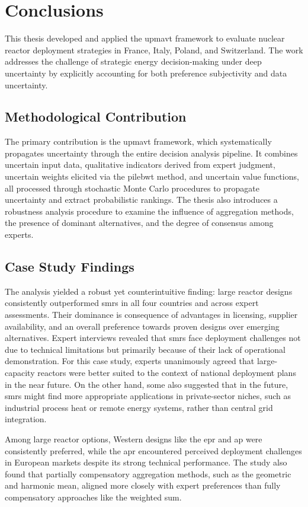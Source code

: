 \chapter{Conclusions}
\label{sec:conclusions}
This thesis developed and applied the \gls{upmavt} framework to evaluate nuclear reactor deployment strategies in France, Italy, Poland, and Switzerland. The work addresses the challenge of strategic energy decision-making under deep uncertainty by explicitly accounting for both preference subjectivity and data uncertainty.

\section{Methodological Contribution}
The primary contribution is the \gls{upmavt} framework, which systematically propagates uncertainty through the entire decision analysis pipeline. It combines uncertain input data, qualitative indicators derived from expert judgment, uncertain weights elicited via the \gls{pilebwt} method, and uncertain value functions, all processed through stochastic Monte Carlo procedures to propagate uncertainty and extract probabilistic rankings. The thesis also introduces a robustness analysis procedure to examine the influence of aggregation methods, the presence of dominant alternatives, and the degree of consensus among experts.

\section{Case Study Findings}
The analysis yielded a robust yet counterintuitive finding: large reactor designs consistently outperformed \glspl{smr} in all four countries and across expert assessments. Their dominance is consequence of advantages in licensing, supplier availability, and an overall preference towards proven designs over emerging alternatives. Expert interviews revealed that \glspl{smr} face deployment challenges not due to technical limitations but primarily because of their lack of operational demonstration. For this case study, experts unanimously agreed that large-capacity reactors were better suited to the context of national deployment plans in the near future. On the other hand, some also suggested that in the future, \glspl{smr} might find more appropriate applications in private-sector niches, such as industrial process heat or remote energy systems, rather than central grid integration.

Among large reactor options, Western designs like the \gls{epr} and \gls{ap} were consistently preferred, while the \gls{apr} encountered perceived deployment challenges in European markets despite its strong technical performance. The study also found that partially compensatory aggregation methods, such as the geometric and harmonic mean, aligned more closely with expert preferences than fully compensatory approaches like the weighted sum.

